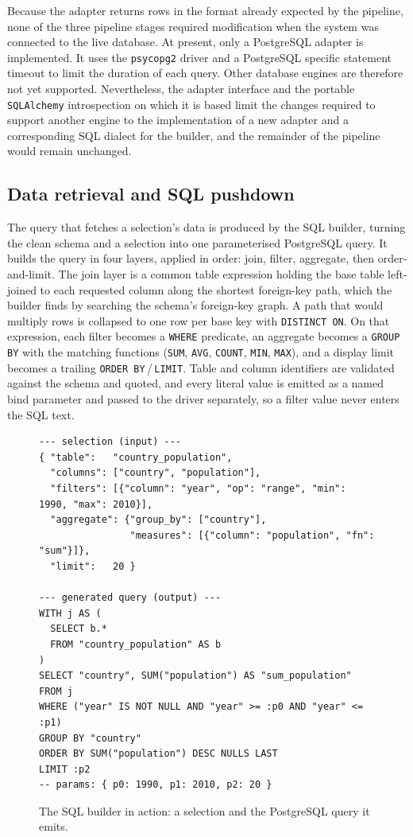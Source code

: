 Because the adapter returns rows in the format already expected by the pipeline, none of the three pipeline stages required modification when the system was connected to the live database. At present, only a PostgreSQL adapter is implemented. It uses the \texttt{psycopg2} driver and a PostgreSQL specific statement timeout to limit the duration of each query. Other database engines are therefore not yet supported. Nevertheless, the adapter interface and the portable \texttt{SQLAlchemy} introspection on which it is based limit the changes required to support another engine to the implementation of a new adapter and a corresponding SQL dialect for the builder, and the remainder of the pipeline would remain unchanged.

\subsection{Data retrieval and SQL pushdown}
\label{sec:impl-pushdown}

The query that fetches a selection's data is produced by the SQL builder, turning the clean schema and a selection into one parameterised PostgreSQL query. It builds the query in four layers, applied in order: join, filter, aggregate, then order-and-limit. The join layer is a common table expression holding the base table left-joined to each requested column along the shortest foreign-key path, which the builder finds by searching the schema's foreign-key graph. A path that would multiply rows is collapsed to one row per base key with \texttt{DISTINCT ON}. On that expression, each filter becomes a \texttt{WHERE} predicate, an aggregate becomes a \texttt{GROUP BY} with the matching functions (\texttt{SUM}, \texttt{AVG}, \texttt{COUNT}, \texttt{MIN}, \texttt{MAX}), and a display limit becomes a trailing \texttt{ORDER BY}\,/\,\texttt{LIMIT}. Table and column identifiers are validated against the schema and quoted, and every literal value is emitted as a named bind parameter and passed to the driver separately, so a filter value never enters the SQL text. 

\begin{figure}[htbp]
\begin{lstlisting}[style=prompt]
--- selection (input) ---
{ "table":   "country_population",
  "columns": ["country", "population"],
  "filters": [{"column": "year", "op": "range", "min": 1990, "max": 2010}],
  "aggregate": {"group_by": ["country"],
                "measures": [{"column": "population", "fn": "sum"}]},
  "limit":   20 }

--- generated query (output) ---
WITH j AS (
  SELECT b.*
  FROM "country_population" AS b
)
SELECT "country", SUM("population") AS "sum_population"
FROM j
WHERE ("year" IS NOT NULL AND "year" >= :p0 AND "year" <= :p1)
GROUP BY "country"
ORDER BY SUM("population") DESC NULLS LAST
LIMIT :p2
-- params: { p0: 1990, p1: 2010, p2: 20 }
\end{lstlisting}
\caption{The SQL builder in action: a selection and the PostgreSQL query it emits.}
\label{lst:sql}
\end{figure}

